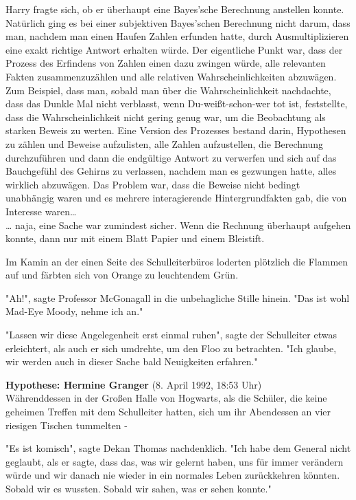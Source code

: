 {Harry fragte sich, ob er überhaupt eine Bayes'sche Berechnung anstellen konnte. Natürlich ging es bei einer subjektiven Bayes'schen Berechnung nicht darum, dass man, nachdem man einen Haufen Zahlen erfunden hatte, durch Ausmultiplizieren eine exakt richtige Antwort erhalten würde. Der eigentliche Punkt war, dass der Prozess des Erfindens von Zahlen einen dazu zwingen würde, alle relevanten Fakten zusammenzuzählen und alle relativen Wahrscheinlichkeiten abzuwägen. Zum Beispiel, dass man, sobald man über die Wahrscheinlichkeit nachdachte, dass das Dunkle Mal nicht verblasst, wenn Du-weißt-schon-wer tot ist, feststellte, dass die Wahrscheinlichkeit nicht gering genug war, um die Beobachtung als starken Beweis zu werten. Eine Version des Prozesses bestand darin, Hypothesen zu zählen und Beweise aufzulisten, alle Zahlen aufzustellen, die Berechnung durchzuführen und dann die endgültige Antwort zu verwerfen und sich auf das Bauchgefühl des Gehirns zu verlassen, nachdem man es gezwungen hatte, alles wirklich abzuwägen. Das Problem war, dass die Beweise nicht bedingt unabhängig waren und es mehrere interagierende Hintergrundfakten gab, die von Interesse waren…\\ … naja, eine Sache war zumindest sicher. Wenn die Rechnung überhaupt aufgehen konnte, dann nur mit einem Blatt Papier und einem Bleistift.

Im Kamin an der einen Seite des Schulleiterbüros loderten plötzlich die Flammen auf und färbten sich von Orange zu leuchtendem Grün.

"Ah!", sagte Professor McGonagall in die unbehagliche Stille hinein. "Das ist wohl Mad-Eye Moody, nehme ich an."

"Lassen wir diese Angelegenheit erst einmal ruhen", sagte der Schulleiter etwas erleichtert, als auch er sich umdrehte, um den Floo zu betrachten. "Ich glaube, wir werden auch in dieser Sache bald Neuigkeiten erfahren."

\textbf{Hypothese: Hermine Granger} (8. April 1992, 18:53 Uhr)\\ Währenddessen in der Großen Halle von Hogwarts, als die Schüler, die keine geheimen Treffen mit dem Schulleiter hatten, sich um ihr Abendessen an vier riesigen Tischen tummelten -

"Es ist komisch", sagte Dekan Thomas nachdenklich. "Ich habe dem General nicht geglaubt, als er sagte, dass das, was wir gelernt haben, uns für immer verändern würde und wir danach nie wieder in ein normales Leben zurückkehren könnten. Sobald wir es wussten. Sobald wir sahen, was er sehen konnte."

}
